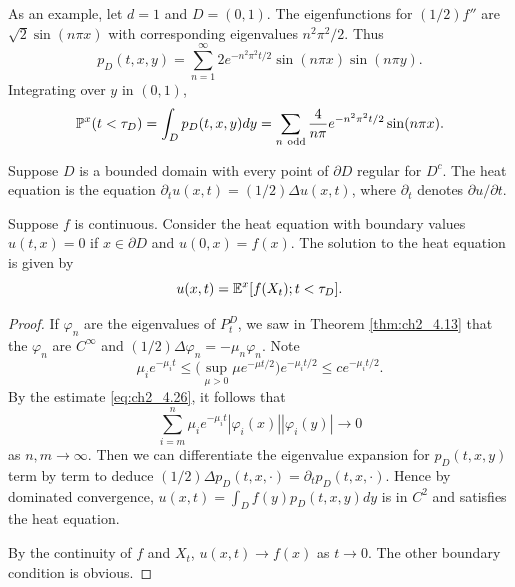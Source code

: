 As an example, let $d = 1$ and $D = (0,1)$. The eigenfunctions for
$(1/2)f''$ are $\sqrt{2}\sin(n\pi x)$ with corresponding eigenvalues $n^2\pi^2/2$. Thus
\begin{equation}\label{eq:ch2_4.29}
    p_D(t,x,y) = \sum_{n=1}^{\infty} 2e^{-n^2\pi^2t/2}\sin(n\pi x)\sin(n\pi y).
\end{equation}
Integrating over $y$ in $(0,1)$,
\begin{equation}\label{eq:ch2_4.30}
    \P^x(t < \tau_D) = \int_D p_D(t,x,y)dy = \sum_{n~\text{odd}} \frac{4}{n\pi}e^{-n^2\pi^2t/2}\sin(n\pi x).
\end{equation}



Suppose $D$ is a bounded domain with every point of $\partial D$ regular for $D^c$. The heat equation is the equation $\partial_tu(x,t) = (1/2)\Delta u(x,t)$, where $\partial_t$ denotes $\partial u/\partial t$.


\begin{theorem}\label{thm:ch2_4.14}
Suppose $f$ is continuous. Consider the heat equation with boundary values $u(t,x) = 0$ if $x \in \partial D$ and $u(0,x) = f(x)$. The solution to the heat equation is given by
\[
    u(x,t) = \E^x[f(X_t); t < \tau_D].
\]
\end{theorem}

\begin{proof}
If $\varphi_n$ are the eigenvalues of $P_t^D$, we saw in Theorem \ref{thm:ch2_4.13} that the $\varphi_n$ are $C^\infty$ and $(1/2)\Delta\varphi_n = -\mu_n\varphi_n$. Note
\[
    \mu_ie^{-\mu_it} \leq \Big(\sup_{\mu>0} \mu e^{-\mu t/2}\Big)e^{-\mu_it/2} \leq ce^{-\mu_it/2}.
\]
By the estimate \eqref{eq:ch2_4.26}, it follows that
\[
    \sum_{i=m}^n \mu_ie^{-\mu_it}|\varphi_i(x)||\varphi_i(y)| \to 0
\]
as $n,m \to \infty$. Then we can differentiate the eigenvalue expansion for $p_D(t,x,y)$ term by term to deduce $(1/2)\Delta p_D(t,x,\cdot) = \partial_tp_D(t,x,\cdot)$. Hence by dominated convergence, $u(x,t) = \int_D f(y)p_D(t,x,y)dy$ is in $C^2$ and satisfies the heat equation.

By the continuity of $f$ and $X_t$, $u(x,t) \to f(x)$ as $t \to 0$. The other boundary condition is obvious.
\end{proof}

